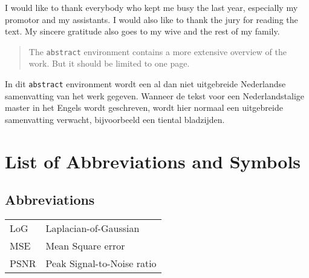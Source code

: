\documentclass[master=cws,masteroption=mmc,english]{kulemt}
\begin{document}
	
	\begin{preface}
		I would like to thank everybody who kept me busy the last year,
		especially my promotor and my assistants. I would also like to thank the
		jury for reading the text. My sincere gratitude also goes to my wive and
		the rest of my family.
	\end{preface}
	
	\tableofcontents*
	
	\begin{abstract}
		The \texttt{abstract} environment contains a more extensive overview of
		the work. But it should be limited to one page.
		
		\lipsum[1]
	\end{abstract}
	
	\begin{abstract*}
		In dit \texttt{abstract} environment wordt een al dan niet uitgebreide
		Nederlandse samenvatting van het werk gegeven.
		Wanneer de tekst voor een Nederlandstalige master in het Engels wordt
		geschreven, wordt hier normaal een uitgebreide samenvatting verwacht,
		bijvoorbeeld een tiental bladzijden. 
		
		\lipsum[1]
	\end{abstract*}
	
	\listoffiguresandtables
	\chapter{List of Abbreviations and Symbols}
	\section*{Abbreviations}
	\begin{flushleft}
		\renewcommand{\arraystretch}{1.1}
		\begin{tabularx}{\textwidth}{@{}p{12mm}X@{}}
			LoG   & Laplacian-of-Gaussian \\
			MSE   & Mean Square error \\
			PSNR  & Peak Signal-to-Noise ratio \\
		\end{tabularx}
	\end{flushleft}
\end{document}
